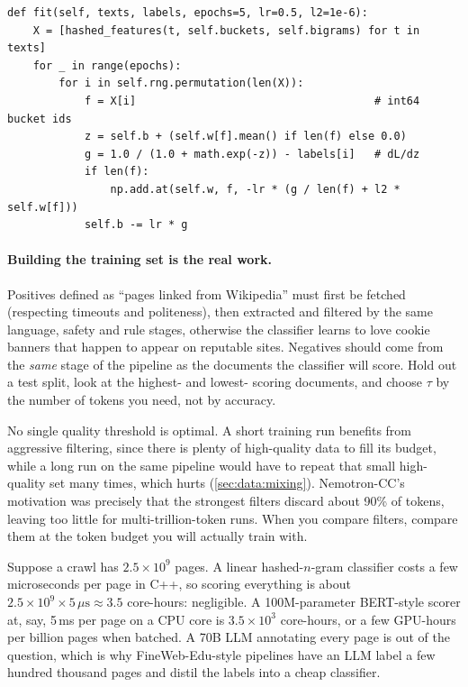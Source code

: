 \begin{lstlisting}[caption={Training the hashed $n$-gram classifier with SGD (from \code{llmsys/datapipe/classify.py}).},label={lst:data:quality}]
def fit(self, texts, labels, epochs=5, lr=0.5, l2=1e-6):
    X = [hashed_features(t, self.buckets, self.bigrams) for t in texts]
    for _ in range(epochs):
        for i in self.rng.permutation(len(X)):
            f = X[i]                                     # int64 bucket ids
            z = self.b + (self.w[f].mean() if len(f) else 0.0)
            g = 1.0 / (1.0 + math.exp(-z)) - labels[i]   # dL/dz
            if len(f):
                np.add.at(self.w, f, -lr * (g / len(f) + l2 * self.w[f]))
            self.b -= lr * g
\end{lstlisting}

\paragraph{Building the training set is the real work.} Positives defined as ``pages linked from
Wikipedia'' must first be fetched (respecting timeouts and politeness), then extracted and filtered by
the same language, safety and rule stages, otherwise the classifier learns to love cookie banners
that happen to appear on reputable sites. Negatives should come from the \emph{same} stage of the pipeline as
the documents the classifier will score. Hold out a test split, look at the highest- and lowest-
scoring documents, and choose $\tau$ by the number of tokens you need, not by accuracy.

\begin{keyidea}
No single quality threshold is optimal. A short training run benefits from aggressive filtering,
since there is plenty of high-quality data to fill its budget, while a long run on the same pipeline would
have to repeat that small high-quality set many times, which hurts (\cref{sec:data:mixing}).
Nemotron-CC's motivation was precisely that the strongest filters discard about 90\% of tokens,
leaving too little for multi-trillion-token runs. When you compare filters, compare them at the
token budget you will actually train with.
\end{keyidea}

\begin{napkinmath}
Suppose a crawl has $2.5\times10^{9}$ pages. A linear hashed-$n$-gram classifier costs a few
microseconds per page in C++, so scoring everything is about $2.5\times10^9\times 5\,\mu\text{s}
\approx 3.5$ core-hours: negligible. A 100M-parameter BERT-style scorer at, say, 5\,ms per page
on a CPU core is $3.5\times10^{3}$ core-hours, or a few GPU-hours per billion pages when batched.
A 70B LLM annotating every page is out of the question, which is why FineWeb-Edu-style pipelines
have an LLM label a few hundred thousand pages and distil the labels into a cheap classifier.
\end{napkinmath}

